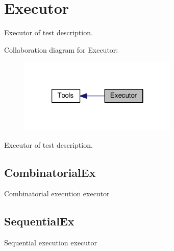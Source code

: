 \hypertarget{group___executor}{\section{Executor}
\label{group___executor}
}


Executor of test description.  


Collaboration diagram for Executor\-:
\nopagebreak
\begin{figure}[H]
\begin{center}
\leavevmode
\includegraphics[width=214pt]{group___executor}
\end{center}
\end{figure}
Executor of test description. \hypertarget{group___executor_CombinatorialEx}{}\subsection{Combinatorial\-Ex}\label{group___executor_CombinatorialEx}
Combinatorial execution executor\hypertarget{group___executor_SequentialEx}{}\subsection{Sequential\-Ex}\label{group___executor_SequentialEx}
Sequential execution executor 